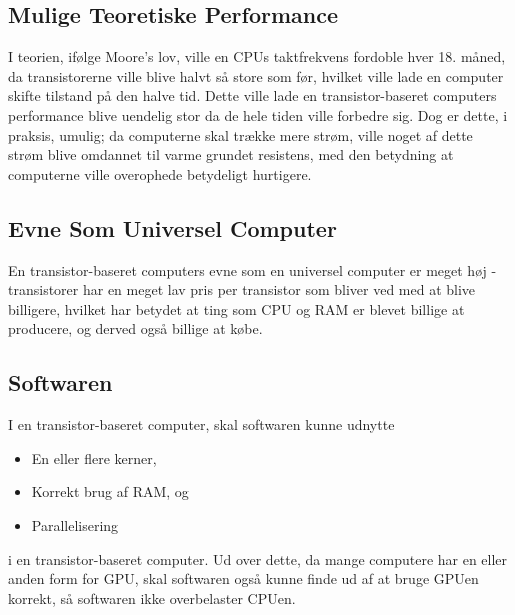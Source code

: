 \subsection{Mulige Teoretiske Performance}
I teorien, ifølge Moore's lov, ville en CPUs taktfrekvens 
fordoble hver 18. måned, da transistorerne ville blive halvt så store 
som før, hvilket ville lade en computer skifte tilstand på den halve 
tid. Dette ville lade en transistor-baseret computers performance 
blive uendelig stor da de hele tiden ville forbedre sig. Dog er dette, 
i praksis, umulig; da computerne skal trække mere strøm, ville noget 
af dette strøm blive omdannet til varme grundet resistens, med den 
betydning at computerne ville overophede betydeligt hurtigere.
\subsection{Evne Som Universel Computer}
En transistor-baseret computers evne som en universel computer er 
meget høj - transistorer har en meget lav pris per transistor som bliver 
ved med at blive billigere, hvilket har betydet at ting som CPU og RAM 
er blevet billige at producere, og derved også billige at købe.
\subsection{Softwaren}
I en transistor-baseret computer, skal softwaren kunne udnytte 
\begin{itemize}
\item En eller flere kerner,
\item Korrekt brug af RAM, og
\item Parallelisering
\end{itemize}
i en transistor-baseret computer. Ud over dette, da mange computere 
har en eller anden form for GPU, skal softwaren også kunne finde ud af 
at bruge GPUen korrekt, så softwaren ikke overbelaster CPUen.
